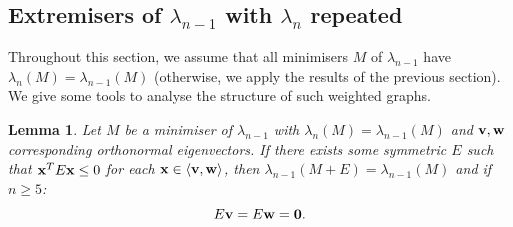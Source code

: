 \documentclass[12pt]{article}
\newtheorem{lmm}[thm]{Lemma}
\begin{document}
\subsection{Extremisers of $\lambda_{n-1}$ with $\lambda_n$ repeated} \label{sec:repfinaleig}
Throughout this section, we assume that all minimisers $M$ of $\lambda_{n-1}$ have $\lambda_{n}(M)=\lambda_{n-1}(M)$ (otherwise, we apply the results of the previous section). We give some tools to analyse the structure of such weighted graphs.
\begin{lmm} \label{negdef} Let $M$ be a minimiser of $\lambda_{n-1}$ with $\lambda_{n}(M)=\lambda_{n-1}(M)$ and $\bold{v,w}$ corresponding orthonormal eigenvectors. If there exists some symmetric $E$ such that $\bold{x}^TE\bold{x} \le 0$ for each $\bold{x}\in \braket{\bold{v,w}}$, then $\lambda_{n-1}(M+E) = \lambda_{n-1}(M)$ and if $n\ge 5$:
\begin{equation*}
    E\bold{v} = E\bold{w} = \bold{0}.
\end{equation*}
\end{lmm}
\end{document}
